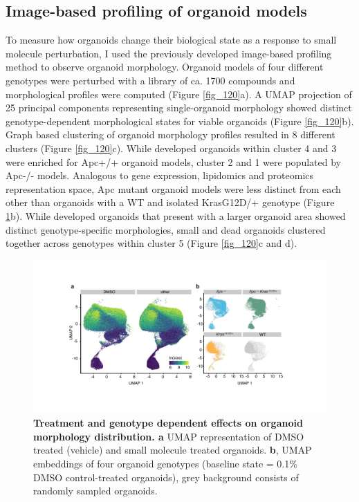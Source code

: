 \begin{flushleft}
\newpage
\section{Image-based profiling of organoid models}

To measure how organoids change their biological state as a response to small molecule perturbation, I used the previously developed image-based profiling method to observe organoid morphology. Organoid models of four different genotypes were perturbed with a library of ca. 1700 compounds and morphological profiles were computed (Figure \ref{fig_120}a). A UMAP projection of 25 principal components representing single-organoid morphology showed distinct genotype-dependent morphological states for viable organoids (Figure \ref{fig_120}b). Graph based clustering of organoid morphology profiles resulted in 8 different clusters (Figure \ref{fig_120}c). While developed organoids within cluster 4 and 3 were enriched for Apc+/+ organoid models, cluster 2 and 1 were populated by Apc-/- models. Analogous to gene expression, lipidomics and proteomics representation space, Apc mutant organoid models were less distinct from each other than organoids with a WT and isolated KrasG12D/+ genotype (Figure \ref{fig_140}b). While developed organoids that present with a larger organoid area showed distinct genotype-specific morphologies, small and dead organoids clustered together across genotypes within cluster 5 (Figure \ref{fig_120}c and d). 

\begin{figure}[h]
\centering
\includegraphics[width=\textwidth,
                height=\textheight,
                keepaspectratio]{figures/adenomaprofiling/pdf/fig_1_4.pdf}
\caption{\textbf{Treatment and genotype dependent effects on organoid morphology distribution. a} UMAP representation of DMSO treated (vehicle) and small molecule treated organoids. \textbf{b}, UMAP embeddings of four organoid genotypes (baseline state = 0.1\% DMSO control-treated organoids), grey background consists of randomly sampled organoids.}
\label{fig_140}
\end{figure}
\bigbreak


\end{flushleft}
